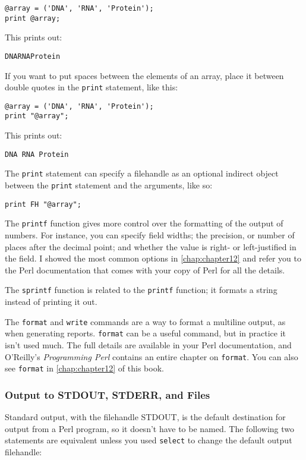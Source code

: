 \begin{lstlisting}
@array = ('DNA', 'RNA', 'Protein');
print @array;
\end{lstlisting}

This prints out:

\begin{lstlisting}
DNARNAProtein
\end{lstlisting}

If you want to put spaces between the elements of an array, place it between double quotes in the \verb|print| statement, like this:

\begin{lstlisting}
@array = ('DNA', 'RNA', 'Protein');
print "@array";
\end{lstlisting}

This prints out:

\begin{lstlisting}
DNA RNA Protein
\end{lstlisting}

The \verb|print| statement can specify a filehandle as an optional indirect object between the \verb|print| statement and the arguments, like so:

\begin{lstlisting}
print FH "@array";
\end{lstlisting}

The \verb|printf| function gives more control over the formatting of the output of numbers. For instance, you can specify field widths; the precision, or number of places after the decimal point; and whether the value is right- or left-justified in the field. I showed the most common options in \autoref{chap:chapter12} and refer you to the Perl documentation that comes with your copy of Perl for all the details.

The \verb|sprintf| function is related to the \verb|printf| function; it formats a string instead of printing it out.

The \verb|format| and \verb|write| commands are a way to format a multiline output, as when generating reports. \verb|format| can be a useful command, but in practice it isn't used much. The full details are available in your Perl documentation, and O'Reilly's \textit{Programming Perl} contains an entire chapter on \verb|format|. You can also see \verb|format| in \autoref{chap:chapter12} of this book.

\subsubsection{Output to STDOUT, STDERR, and Files}
Standard output, with the filehandle STDOUT, is the default destination for output from a Perl program, so it doesn't have to be named. The following two statements are equivalent unless you used \verb|select| to change the default output filehandle:

